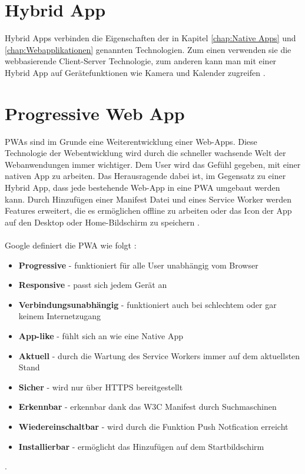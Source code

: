 \section{Hybrid App}
Hybrid Apps verbinden die Eigenschaften der in Kapitel \ref{chap:Native Apps} und \ref{chap:Webapplikationen} genannten Technologien. Zum einen verwenden sie die webbasierende Client-Server Technologie, zum anderen kann man mit einer Hybrid App auf Gerätefunktionen wie Kamera und Kalender zugreifen \cite{HybridApps}. 

\section{Progressive Web App}\label{chap:ProgressiveWebapplikationen}
\acl{PWA}s sind im Grunde eine Weiterentwicklung einer \acs{Web-App}s. Diese Technologie der Webentwicklung wird durch die schneller wachsende Welt der Webanwendungen immer wichtiger. 
Dem User wird das Gefühl gegeben, mit einer nativen App zu arbeiten. Das Herausragende dabei ist, im Gegensatz zu einer Hybrid App, dass jede bestehende \acs{Web-App} in eine \acs{PWA} umgebaut werden kann.
Durch Hinzufügen einer Manifest Datei und eines Service Worker werden Features erweitert, die es ermöglichen offline zu arbeiten oder das Icon der App auf den Desktop oder Home-Bildschirm zu speichern \cite{PWA} \cite{PWAAdjectives}.\\ \\
Google definiert die \acs{PWA} wie folgt :
\begin{itemize}
    \item  \textbf{Progressive} - funktioniert für alle User unabhängig vom Browser
	\item  \textbf{Responsive} - passt sich jedem Gerät an	
	\item  \textbf{Verbindungsunabhängig} - funktioniert auch bei schlechtem oder gar keinem Internetzugang
	\item  \textbf{App-like} - fühlt sich an wie eine Native App
	\item  \textbf{Aktuell} - durch die Wartung des Service Workers immer auf dem aktuellsten Stand
	\item  \textbf{Sicher} - wird nur über HTTPS bereitgestellt
	\item  \textbf{Erkennbar} - erkennbar dank das W3C Manifest durch Suchmaschinen
	\item  \textbf{Wiedereinschaltbar} - wird durch die Funktion Push Notfication erreicht
	\item  \textbf{Installierbar} - ermöglicht das Hinzufügen auf dem Startbildschirm
\end{itemize}. 


